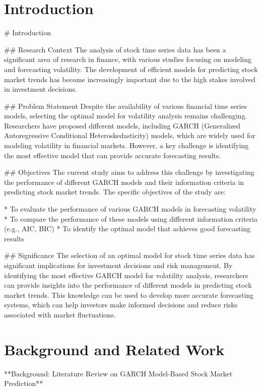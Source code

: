 \documentclass[conference]{IEEEtran}
\begin{document}
\section{Introduction}
\# Introduction

\#\# Research Context
The analysis of stock time series data has been a significant area of research in finance, with various studies focusing on modeling and forecasting volatility. The development of efficient models for predicting stock market trends has become increasingly important due to the high stakes involved in investment decisions.

\#\# Problem Statement
Despite the availability of various financial time series models, selecting the optimal model for volatility analysis remains challenging. Researchers have proposed different models, including GARCH (Generalized Autoregressive Conditional Heteroskedasticity) models, which are widely used for modeling volatility in financial markets. However, a key challenge is identifying the most effective model that can provide accurate forecasting results.

\#\# Objectives
The current study aims to address this challenge by investigating the performance of different GARCH models and their information criteria in predicting stock market trends. The specific objectives of the study are:

* To evaluate the performance of various GARCH models in forecasting volatility
* To compare the performance of these models using different information criteria (e.g., AIC, BIC)
* To identify the optimal model that achieves good forecasting results

\#\# Significance
The selection of an optimal model for stock time series data has significant implications for investment decisions and risk management. By identifying the most effective GARCH model for volatility analysis, researchers can provide insights into the performance of different models in predicting stock market trends. This knowledge can be used to develop more accurate forecasting systems, which can help investors make informed decisions and reduce risks associated with market fluctuations.

\section{Background and Related Work}
**Background: Literature Review on GARCH Model-Based Stock Market Prediction**
\end{document}
